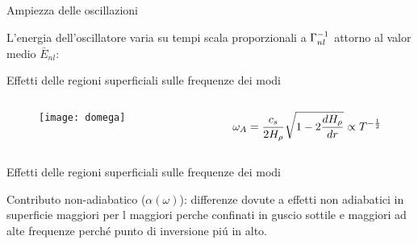 \documentclass[10pt,xcolor={usenames},fleqn,mathserif,serif]{beamer}
\begin{document}
\begin{wordonframe}{Ampiezza delle oscillazioni}

L'energia dell'oscillatore varia su tempi scala proporzionali a ${\Gamma}^{-1}_{nl}$ attorno al valor medio $\bar{E}_{nl}$:

\end{wordonframe}

\begin{frame}{Effetti delle regioni superficiali sulle frequenze dei modi}

\begin{columns}

\begin{column}{0.5\textwidth}

\begin{figure}
\texttt{[image: domega]}
\end{figure}

\end{column}

\begin{column}{0.5\textwidth}
%
\begin{align*}
&\omega_A=\frac{c_s}{2H_{\rho}{}}\sqrt{1-2\frac{d H_{\rho}{}}{d r}}\propto T^{-\frac{1}{2}}
\end{align*}


\end{column}

\end{columns}

\end{frame}

\begin{wordonframe}{Effetti delle regioni superficiali sulle frequenze dei modi}

Contributo non-adiabatico ($\alpha(\omega)$): differenze dovute a effetti non adiabatici in superficie maggiori per l maggiori perche confinati in guscio sottile e maggiori ad alte frequenze perch\'e punto di inversione pi\'u in alto.

\end{wordonframe}
\end{document}
